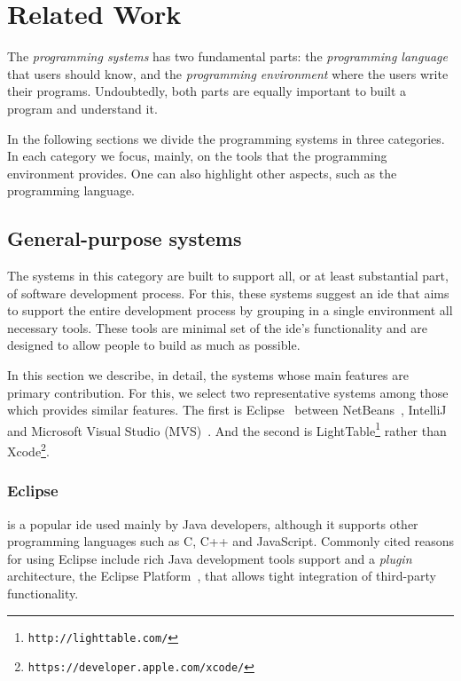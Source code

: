 
% 
% 

\section{Related Work}
\label{sec:rw}
The \textit{programming systems} has two fundamental parts: the \textit{programming language} that users should know, and the \textit{programming environment} where the users write their programs. Undoubtedly, both parts are equally important to built a program and understand it.

In the following sections we divide the programming systems in three categories. In each category we focus, mainly, on the tools that the programming environment provides. One can also highlight other aspects, such as the programming language.
\subsection{General-purpose systems}

The systems in this category are built to support all, or at least substantial part, of software development process. For this, these systems suggest an \ac{ide} that aims to support the entire development process by grouping in a single environment all necessary tools. These tools are minimal set of the \ac{ide}'s functionality and are designed to allow people to build as much as possible.

In this section we describe, in detail, the systems whose main features are primary contribution. For this, we select two representative systems among those which provides similar features. The first is Eclipse~\cite{carlson2005eclipse} between NetBeans~\cite{boudreau2002netbeans}, IntelliJ~\cite{intellij2001intellij} and Microsoft Visual Studio (MVS)~\cite{guckenheimer2006software}. And the second is LightTable\footnote{\label{lt:note}\texttt{http://lighttable.com/}} rather than Xcode\footnote{\texttt{https://developer.apple.com/xcode/}}.
\subsubsection{Eclipse~\cite{carlson2005eclipse}} is a popular \ac{ide} used mainly by Java developers, although it supports other programming languages such as C, C++ and JavaScript. Commonly cited reasons for using Eclipse include rich Java development tools support and a \textit{plugin} architecture, the Eclipse Platform~\cite{DesRivieres2004}, that allows tight integration of third-party functionality.

